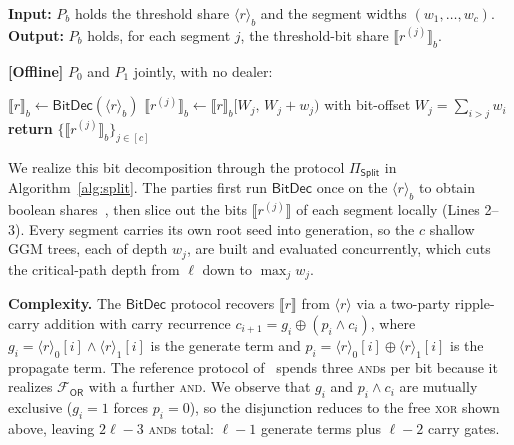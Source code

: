\documentclass[journal]{IEEEtran}
\theoremstyle{definition}
\theoremstyle{plain}
\newcommand{\Z}{\mathbb{Z}}
\newcommand{\ashare}[1]{\langle #1 \rangle}             %
\newcommand{\bshare}[1]{\llbracket #1 \rrbracket}        %
\newcommand{\xhat}{\hat{x}}
\newcommand{\seg}[1]{^{\scriptscriptstyle(#1)}}   %
\newcommand{\nseg}{c}                              %
\newcommand{\wseg}{w}                              %
\begin{document}
\begin{algorithm}[t]
\caption{Per-segment threshold decomposition ($\Pi_{\mathsf{Split}}$)}
\label{alg:split}
\textbf{Input:} $P_b$ holds the threshold share $\ashare{r}_b$ and the segment widths $(\wseg_1,\dots,\wseg_{\nseg})$. \\
\textbf{Output:} $P_b$ holds, for each segment $j$, the threshold-bit share $\bshare{r\seg{j}}_b$.

\vspace{0.3em}
\textbf{[Offline]} $P_0$ and $P_1$ jointly, with no dealer:
\begin{algorithmic}[1]
\State $\bshare{r}_b \gets \textsf{BitDec}(\ashare{r}_b)$ 
\For{$j=1$ to $\nseg$}
  \State $\bshare{r\seg{j}}_b \gets \bshare{r}_b[W_j,\,W_j{+}\wseg_j)$ with bit-offset $W_j=\sum_{i>j}\wseg_i$
\EndFor
\State \textbf{return} $\big\{\bshare{r\seg{j}}_b\big\}_{j\in[\nseg]}$
\end{algorithmic}
\end{algorithm}

We realize this bit decomposition through the protocol $\Pi_{\mathsf{Split}}$
in Algorithm~\ref{alg:split}. The parties first run $\textsf{BitDec}$ once on the
$\ashare{r}_b$ to obtain boolean shares~\cite{distfss}, then slice out
the bits $\bshare{r\seg{j}}$ of each segment locally (Lines 2--3). Every segment
carries its own root seed into generation, so the $\nseg$
shallow GGM trees, each of depth $\wseg_j$, are built and evaluated concurrently,
which cuts the critical-path depth from $\ell$ down to $\max_j\wseg_j$. 

\textbf{Complexity.} The $\textsf{BitDec}$ protocol recovers $\bshare{r}$ from
$\ashare{r}$ via a two-party ripple-carry addition with carry recurrence
$c_{i+1}=g_i\oplus(p_i\wedge c_i)$, where $g_i=\ashare{r}_0[i]\wedge\ashare{r}_1[i]$
is the generate term and $p_i=\ashare{r}_0[i]\oplus\ashare{r}_1[i]$ is the propagate term.
The reference protocol of~\cite{distfss} spends three \textsc{and}s per bit
because it realizes $\mathcal{F}_{\mathsf{OR}}$ with a further \textsc{and}.
We observe that $g_i$ and $p_i\wedge c_i$ are mutually exclusive
($g_i=1$ forces $p_i=0$), so the disjunction reduces to the free \textsc{xor}
shown above, leaving $2\ell-3$ \textsc{and}s total: $\ell-1$ generate terms
plus $\ell-2$ carry gates.
\end{document}
